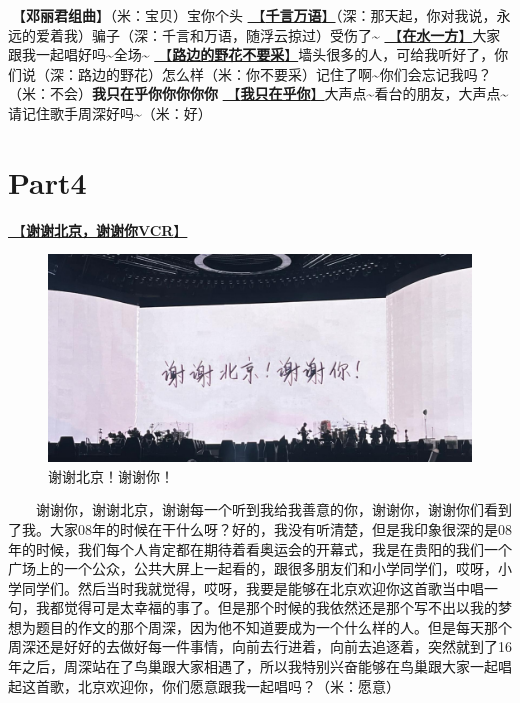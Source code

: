 \documentclass[]{ctexbook}
\begin{document}
🎵【\textbf{邓丽君组曲}】（米：宝贝）宝你个头
\hyperref[thousands-of-words]{🎵【\textbf{千言万语}】}（深：那天起，你对我说，永远的爱着我）骗子（深：千言和万语，随浮云掠过）受伤了\textasciitilde{}
\hyperref[on-the-water-side]{🎵【\textbf{在水一方}】}大家跟我一起唱好吗\textasciitilde 全场\textasciitilde{}
\hyperref[only-with-me]{🎵【\textbf{路边的野花不要采}】}墙头很多的人，可给我听好了，你们说（深：路边的野花）怎么样（米：你不要采）记住了啊\textasciitilde 你们会忘记我吗？（米：不会）\textbf{我只在乎你你你你你}
\hyperref[only-you]{🎵【\textbf{我只在乎你}】}大声点\textasciitilde 看台的朋友，大声点\textasciitilde 请记住歌手周深好吗\textasciitilde（米：好）

\section{Part4}\label{beijing-20240922-part4}

\hyperref[thank-you-vcr]{🎥【\textbf{谢谢北京，谢谢你VCR}】}

\begin{figure}

{\centering \includegraphics[width=400pt]{img/beijing20240921/thank-beijing} 

}

\caption{谢谢北京！谢谢你！}\label{fig:unnamed-chunk-105}
\end{figure}

  谢谢你，谢谢北京，谢谢每一个听到我给我善意的你，谢谢你，谢谢你们看到了我。大家08年的时候在干什么呀？好的，我没有听清楚，但是我印象很深的是08年的时候，我们每个人肯定都在期待着看奥运会的开幕式，我是在贵阳的我们一个广场上的一个公众，公共大屏上一起看的，跟很多朋友们和小学同学们，哎呀，小学同学们。然后当时我就觉得，哎呀，我要是能够在北京欢迎你这首歌当中唱一句，我都觉得可是太幸福的事了。但是那个时候的我依然还是那个写不出以我的梦想为题目的作文的那个周深，因为他不知道要成为一个什么样的人。但是每天那个周深还是好好的去做好每一件事情，向前去行进着，向前去追逐着，突然就到了16年之后，周深站在了鸟巢跟大家相遇了，所以我特别兴奋能够在鸟巢跟大家一起唱起这首歌，北京欢迎你，你们愿意跟我一起唱吗？（米：愿意）
\end{document}
